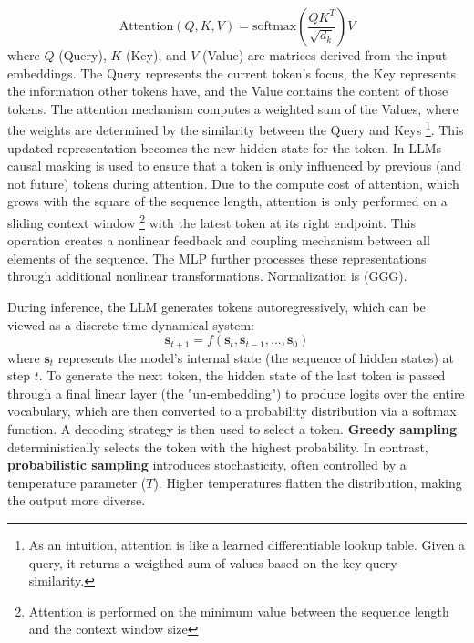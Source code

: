 \documentclass[a4paper,12pt]{article}
\begin{document}
\begin{equation}
    \text{Attention}(Q, K, V) = \text{softmax}\left(\frac{QK^T}{\sqrt{d_k}}\right)V
\end{equation}
where $Q$ (Query), $K$ (Key), and $V$ (Value) are matrices derived from the input embeddings. The Query represents the current token's focus, the Key represents the information other tokens have, and the Value contains the content of those tokens. The attention mechanism computes a weighted sum of the Values, where the weights are determined by the similarity between the Query and Keys \footnote{As an intuition, attention is like a learned differentiable lookup table. Given a query, it returns a weigthed sum of values based on the key-query similarity.}. This updated representation becomes the new hidden state for the token.
In LLMs causal masking is used to ensure that a token is only influenced by previous (and not future) tokens during attention. Due to the compute cost of attention, which grows with the square of the sequence length, attention is only performed on a sliding context window \footnote{Attention is performed on the minimum value between the sequence length and the context window size} with the latest token at its right endpoint.
This operation creates a nonlinear feedback and coupling mechanism between all elements of the sequence. The MLP further processes these representations through additional nonlinear transformations. Normalization is (GGG). 

During inference, the LLM generates tokens autoregressively, which can be viewed as a discrete-time dynamical system:
\begin{equation}
    \mathbf{s}_{t+1} = f(\mathbf{s}_t, \mathbf{s}_{t-1}, ..., \mathbf{s}_0) %
\end{equation}
where $\mathbf{s}_t$ represents the model's internal state (the sequence of hidden states) at step $t$. To generate the next token, the hidden state of the last token is passed through a final linear layer (the "un-embedding") to produce logits over the entire vocabulary, which are then converted to a probability distribution via a softmax function. A decoding strategy is then used to select a token. \textbf{Greedy sampling} deterministically selects the token with the highest probability. In contrast, \textbf{probabilistic sampling} introduces stochasticity, often controlled by a temperature parameter ($T$). Higher temperatures flatten the distribution, making the output more diverse.
\end{document}
